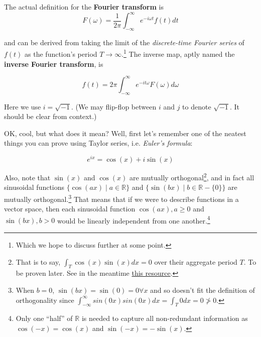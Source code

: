 \documentclass[letterpaper,12pt]{report}
\begin{document}
The actual definition for the \textbf{Fourier transform} is
\begin{equation}
  F(\omega) = \frac{1}{2\pi} \int_{-\infty}^{\infty}e^{-i\omega t}f(t)dt
\end{equation}\label{equation:fourier-transform}


and can be derived from taking 
the limit of the \emph{discrete-time Fourier series} of \(f(t)\) as the function's
period \(T \rightarrow \infty\).\footnote{
  Which we hope to discuss further at some point.
}
The inverse map, aptly named the
\textbf{inverse Fourier transform},
is 

\begin{equation}
  f(t) = {2\pi} \int_{-\infty}^{\infty}e^{-it\omega}F(\omega)d\omega
\end{equation}\label{equation:inverse-fourier-transform}

Here we use \(i = \sqrt{-1}\).
(We may flip-flop between \(i\) and \(j\) to denote \(\sqrt{-1}\).
It should be clear from context.)\par

OK, cool, but what does it mean? Well, first let's remember one of the neatest things
you can prove using Taylor series, i.e. \emph{Euler's formula}:

\[e^{ix} = \cos(x) + i\sin(x) \]

Also, note that
\(\sin(x)\) and \(\cos(x)\)
are mutually orthogonal\footnote{
  That is to say,
  \(\int_T \cos(x)\sin(x)dx = 0 \)
  over their aggregate period \(T\).
  To be proven later. See in the meantime
  \href{http://tutorial.math.lamar.edu/Classes/DE/PeriodicOrthogonal.aspx}{this resource}.
},
and in fact all sinusoidal functions
\(\{\cos(ax) \mid a \in \mathbb{R}\}\) and \(\{\sin(bx) \mid b \in \mathbb{R}-\{0\}\}\)
are mutually orthogonal.\footnote{
  When \(b=0\), \(\sin(bx) = \sin(0) = 0 \forall x\) and so doesn't fit the definition 
  of orthogonality since \(\int_{-\infty}^{\infty}sin(0x)sin(0x)dx = \int_T 0 dx = 0 \ngtr 0\).
}
That means that if we were to describe functions in a vector space, then each 
sinusoidal function \(\cos(ax), a \geq 0\) and 
\(\sin(bx), b > 0\) 
would be linearly independent from one another.\footnote{
  Only one ``half'' of \(\mathbb{R}\) is needed to capture all non-redundant information
  as \(\cos(-x) = \cos(x)\) and \(\sin(-x) = -\sin(x)\).
}
\par
\end{document}
